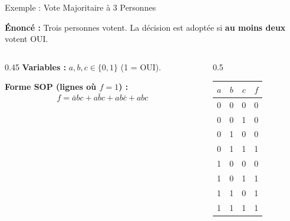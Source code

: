 \begin{frame}{Exemple : Vote Majoritaire à 3 Personnes}

    \textbf{Énoncé :} Trois personnes votent. La décision est adoptée si \textbf{au moins deux} votent OUI.

    \vspace{0.4cm}

    \begin{columns}[T]
        \begin{column}{0.45\textwidth}
            \textbf{Variables :} \(a, b, c \in \{0,1\}\) (1 = OUI).

            \vspace{0.3cm}
            \textbf{Forme SOP (lignes où \(f=1\)) :}
            \[
                f = \bar{a}bc + a\bar{b}c + ab\bar{c} + abc
            \]
        \end{column}
        \begin{column}{0.5\textwidth}
            \centering
            \begin{tabular}{|c|c|c|c|}
                \hline
                \(a\) & \(b\) & \(c\) & \(f\) \\
                \hline
                0 & 0 & 0 & 0 \\
                0 & 0 & 1 & 0 \\
                0 & 1 & 0 & 0 \\
                0 & 1 & 1 & 1 \\
                1 & 0 & 0 & 0 \\
                1 & 0 & 1 & 1 \\
                1 & 1 & 0 & 1 \\
                1 & 1 & 1 & 1 \\
                \hline
            \end{tabular}
        \end{column}
    \end{columns}

\end{frame}

